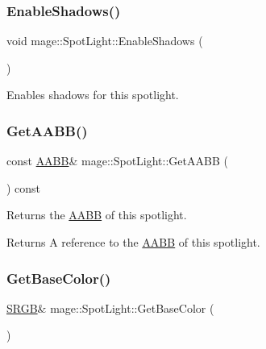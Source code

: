 \subsubsection{\texorpdfstring{Enable\+Shadows()}{EnableShadows()}}
{\footnotesize\ttfamily void mage\+::\+Spot\+Light\+::\+Enable\+Shadows (\begin{DoxyParamCaption}{ }\end{DoxyParamCaption})\hspace{0.3cm}{\ttfamily [noexcept]}}

Enables shadows for this spotlight. \hypertarget{classmage_1_1_spot_light_add184856d7fdb2ff9ae16221d9493bf5}{}\label{classmage_1_1_spot_light_add184856d7fdb2ff9ae16221d9493bf5} 
\subsubsection{\texorpdfstring{Get\+A\+A\+B\+B()}{GetAABB()}}
{\footnotesize\ttfamily const \hyperlink{classmage_1_1_a_a_b_b}{A\+A\+BB}\& mage\+::\+Spot\+Light\+::\+Get\+A\+A\+BB (\begin{DoxyParamCaption}{ }\end{DoxyParamCaption}) const\hspace{0.3cm}{\ttfamily [noexcept]}}

Returns the \hyperlink{classmage_1_1_a_a_b_b}{A\+A\+BB} of this spotlight.

\begin{DoxyReturn}{Returns}
A reference to the \hyperlink{classmage_1_1_a_a_b_b}{A\+A\+BB} of this spotlight. 
\end{DoxyReturn}
\hypertarget{classmage_1_1_spot_light_ad1345ae07a114dc8d4b6a00d08b4230a}{}\label{classmage_1_1_spot_light_ad1345ae07a114dc8d4b6a00d08b4230a} 
\subsubsection{\texorpdfstring{Get\+Base\+Color()}{GetBaseColor()}\hspace{0.1cm}{\footnotesize\ttfamily [1/2]}}
{\footnotesize\ttfamily \hyperlink{structmage_1_1_s_r_g_b}{S\+R\+GB}\& mage\+::\+Spot\+Light\+::\+Get\+Base\+Color (\begin{DoxyParamCaption}{ }\end{DoxyParamCaption})\hspace{0.3cm}{\ttfamily [noexcept]}}

